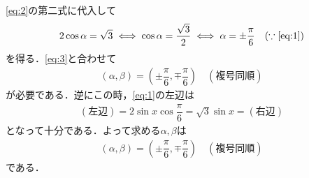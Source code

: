 \documentclass[../../main.tex]{subfiles}
\begin{document}
\cref{eq:2}の第二式に代入して
\begin{align}
  2\cos\alpha = \sqrt{3}
  \iff
  \cos\alpha = \dfrac{\sqrt{3}}{2}
  \iff
  \alpha = \pm\dfrac{\pi}{6} \quad (\because\text{\cref{eq:1}})
\end{align}
を得る．\cref{eq:3}と合わせて
\begin{align}
  (\alpha, \beta) = \left( \pm\dfrac{\pi}{6}, \mp\dfrac{\pi}{6} \right) \quad (\text{複号同順})
\end{align}
が必要である．逆にこの時，\cref{eq:1}の左辺は
\begin{align}
  (\text{左辺}) = 2\sin x \cos\dfrac{\pi}{6} = \sqrt{3}\sin x = (\text{右辺})
\end{align}
となって十分である．よって求める$\alpha,\beta$は
\begin{align}
  (\alpha, \beta) = \left( \pm\dfrac{\pi}{6}, \mp\dfrac{\pi}{6} \right) \quad (\text{複号同順})
\end{align}
である．
\end{document}
